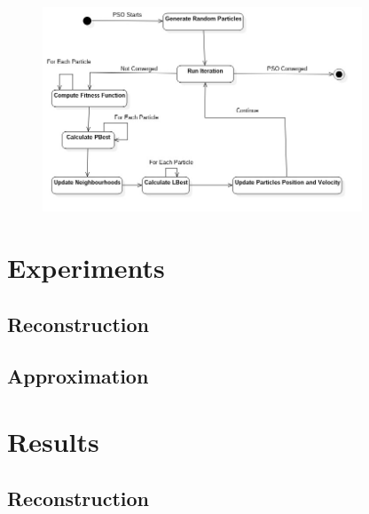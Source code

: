 \documentclass[runningheads, a4paper]{llncs}
\begin{document}
\begin{figure}[h]
    \includegraphics[width=0.85\textwidth]{res/uml/states/pso.jpg}
\end{figure}



\section{Experiments}

\subsection{Reconstruction}
\subsection{Approximation}

\section{Results}


\subsection{Reconstruction}







\end{document}

